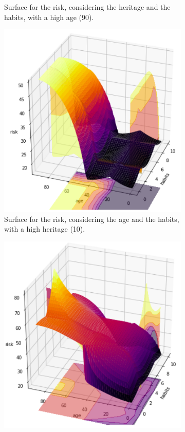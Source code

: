 \begin{figure}[ht]
\begin{subfigure}{.3\textwidth}
  \caption{Surface for the risk, considering the heritage and the habits, with a high age (90).}
  \label{fig:sur6}
\end{subfigure}
\begin{subfigure}{.3\textwidth}
  \centering
  \includegraphics[width=.8\linewidth]{figures/habits-age10.png}
  \caption{Surface for the risk, considering the age and the habits, with a high heritage (10).}
  \label{fig:sur7}
\end{subfigure}
\hspace{10pts}
\begin{subfigure}{.3\textwidth}
  \centering
  \includegraphics[width=.8\linewidth]{figures/habits-age5.png} 

\end{subfigure}
\end{figure}
